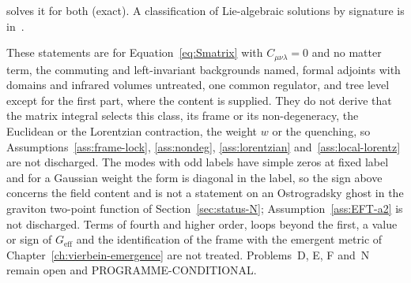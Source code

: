 solves it for both (exact). A classification of Lie-algebraic solutions by signature is in~\cite{Liao2026}.

These statements are for Equation~\eqref{eq:Smatrix} with \(C_{\mu\nu\lambda}=0\) and no matter term, the commuting and left-invariant backgrounds named, formal adjoints with domains and infrared volumes untreated, one common regulator, and tree level except for the first part, where the content is supplied. They do not derive that the matrix integral selects this class, its frame or its non-degeneracy, the Euclidean or the Lorentzian contraction, the weight \(w\) or the quenching, so Assumptions~\ref{ass:frame-lock}, \ref{ass:nondeg}, \ref{ass:lorentzian} and~\ref{ass:local-lorentz} are not discharged. The modes with odd labels have simple zeros at fixed label and for a Gaussian weight the form is diagonal in the label, so the sign above concerns the field content and is not a statement on an Ostrogradsky ghost in the graviton two-point function of Section~\ref{sec:status-N}; Assumption~\ref{ass:EFT-a2} is not discharged. Terms of fourth and higher order, loops beyond the first, a value or sign of \(G_{\mathrm{eff}}\) and the identification of the frame with the emergent metric of Chapter~\ref{ch:vierbein-emergence} are not treated. Problems~D, E, F and~N remain open and PROGRAMME-CONDITIONAL.

